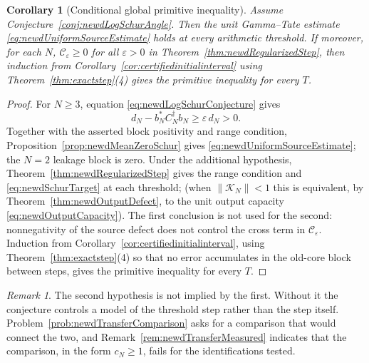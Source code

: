 \documentclass[11pt]{amsart}
\newtheorem{corollary}[theorem]{Corollary}
\theoremstyle{definition}
\theoremstyle{remark}
\newtheorem{remark}[theorem]{Remark}
\begin{document}
\begin{corollary}[Conditional global primitive inequality]
\label{cor:newdConditionalRowD}
Assume Conjecture~\ref{conj:newdLogSchurAngle}.  Then the unit Gamma--Tate
estimate \eqref{eq:newdUniformSourceEstimate} holds at every arithmetic
threshold.  If moreover, for each $N$, $\mathcal C_\varepsilon\geq0$ for all
$\varepsilon>0$ in Theorem~\ref{thm:newdRegularizedStep}, then induction from
Corollary~\ref{cor:certifiedinitialinterval} using
Theorem~\ref{thm:exactstep}(4) gives the primitive inequality for every $T$.
\end{corollary}

\begin{proof}
For $N\geq3$, equation \eqref{eq:newdLogSchurConjecture} gives
\[
 d_N-b_N^*C_N^\dagger b_N
 \geq \varepsilon\,d_N>0 .
\]
Together with the asserted block positivity and range condition,
Proposition~\ref{prop:newdMeanZeroSchur} gives
\eqref{eq:newdUniformSourceEstimate}; the $N=2$ leakage block is zero.  Under
the additional hypothesis, Theorem~\ref{thm:newdRegularizedStep} gives the
range condition and \eqref{eq:newdSchurTarget} at each threshold;
(when \(\|\mathcal K_N\|<1\) this is equivalent, by
Theorem~\ref{thm:newdOutputDefect}, to the unit output capacity
\eqref{eq:newdOutputCapacity}).  The first conclusion is not used for the
second: nonnegativity of the source defect does not control the cross term
in $\mathcal C_\varepsilon$.  Induction from
Corollary~\ref{cor:certifiedinitialinterval}, using
Theorem~\ref{thm:exactstep}(4) so that no error accumulates in the old-core
block between steps, gives the primitive inequality for every $T$.
\end{proof}

\begin{remark}
The second hypothesis is not implied by the first.  Without it the conjecture
controls a model of the threshold step rather than the step itself.
Problem~\ref{prob:newdTransferComparison} asks for a comparison that would
connect the two, and Remark~\ref{rem:newdTransferMeasured} indicates that
the comparison, in the form $c_N\geq1$, fails for the identifications tested.
\end{remark}
\end{document}
